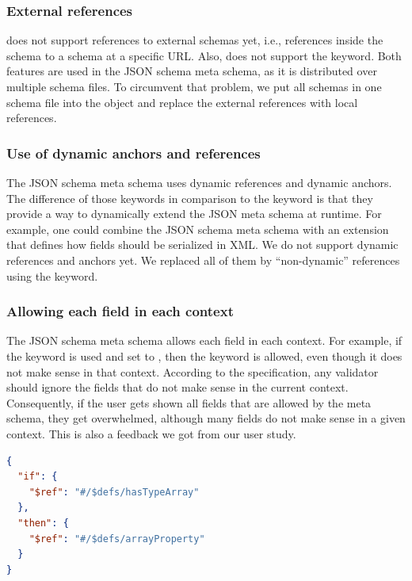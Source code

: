 \subsubsection{External references}
\toolname{} does not support references to external schemas yet, i.e., references inside the schema to a schema at a specific URL\@.
Also, \toolname{} does not support the  keyword.
Both features are used in the JSON schema meta schema, as it is distributed over multiple schema files.
To circumvent that problem, we put all schemas in one schema file into the  object and replace the external references with local references.

\subsubsection{Use of dynamic anchors and references}
The JSON schema meta schema uses dynamic references and dynamic anchors.
The difference of those keywords in comparison to the  keyword is that they provide a way to dynamically extend the JSON meta schema
at runtime.
For example, one could combine the JSON schema meta schema with an extension that defines how fields should be serialized in XML\@.
We do not support dynamic references and anchors yet.
We replaced all of them by ``non-dynamic'' references using the  keyword.

\subsubsection{Allowing each field in each context}
The JSON schema meta schema allows each field in each context.
For example, if the  keyword is used and set to , then the  keyword is allowed,
even though it does not make sense in that context.
According to the specification, any validator should ignore the fields that do not make sense in the current context.
Consequently, if the user gets shown all fields that are allowed by the meta schema, they get overwhelmed, although many fields do not make sense in a given context.
This is also a feedback we got from our user study.

\begin{lstlisting}[language=json, firstnumber=1, caption=
    {If condition for array properties. The \texttt{hasTypeArray} is valid if the current property is of type array. The \texttt{arrayProperty} schema defines the properties of an array.}, captionpos=b,label={lst:if-then-else}]
{
  "if": {
    "$ref": "#/$defs/hasTypeArray"
  },
  "then": {
    "$ref": "#/$defs/arrayProperty"
  }
}
\end{lstlisting}

